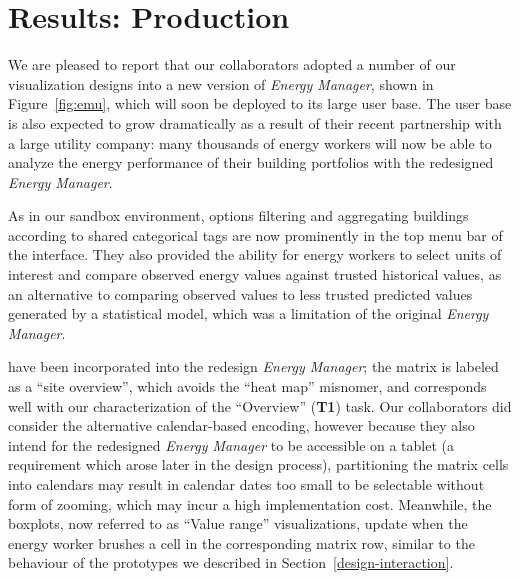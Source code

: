 \documentclass[journal]{vgtc}                %
\newcommand{\bqstart}[1]{\vspace{1mm} \noindent{\textbf{#1}}}
\begin{document}

\section{Results: Production}
\label{production}


We are pleased to report that our collaborators adopted a number of our visualization designs into a new version of {\it Energy Manager}, shown in Figure~\ref{fig:emu}, which will soon be deployed to its large user base.
The user base is also expected to grow dramatically as a result of their recent partnership with a large utility company: many thousands of energy workers will now be able to analyze the energy performance of their building portfolios with the redesigned {\it Energy Manager}.

As in our sandbox environment, options filtering and aggregating buildings according to shared categorical tags are now prominently in the top menu bar of the interface. 
They also provided the ability for energy workers to select units of interest and compare observed energy values against trusted historical values, as an alternative to comparing observed values to less trusted predicted values generated by a statistical model, which was a limitation of the original {\it Energy Manager}.

\bqstart{Coordinated matrix and boxplots} have been incorporated into the redesign {\it Energy Manager}; the matrix is labeled as a ``site overview'', which avoids the ``heat map'' misnomer, and corresponds well with our characterization of the ``Overview'' ({\bf T1}) task. 
Our collaborators did consider the alternative calendar-based encoding, however because they also intend for the redesigned {\it Energy Manager} to be accessible on a tablet (a requirement which arose later in the design process), partitioning the matrix cells into calendars may result in calendar dates too small to be selectable without form of zooming, which may incur a high implementation cost.
Meanwhile, the boxplots, now referred to as ``Value range'' visualizations, update when the energy worker brushes a cell in the corresponding matrix row, similar to the behaviour of the prototypes we described in Section~\ref{design-interaction}. 
\end{document}
